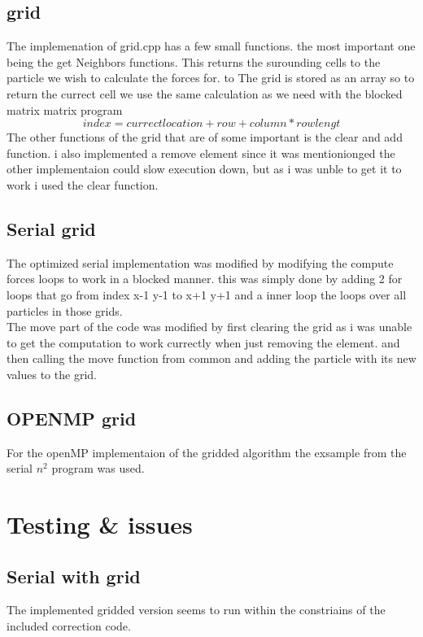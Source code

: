 \documentclass[a4paper,10pt,titlepage]{report}
\begin{document}
\subsection{grid}
The implemenation of grid.cpp has a few small functions. the most important one being the get Neighbors functions. This returns the surounding cells to the particle we wish to calculate the forces for. to The grid is stored as an array so to return the currect cell we use the same calculation as we need with the blocked matrix matrix program
\begin{equation}
index = currect location + row + column * rowlengt
\end{equation}
The other functions of the grid that are of some important is the clear and add function. i also implemented a remove element since it was mentionionged the other implementaion could slow execution down, but as i was unble to get it to work i used the clear function.

\subsection{Serial grid}

The optimized serial implementation was modified by modifying the compute forces loops to work in a blocked manner. this was simply done by adding 2 for loops that go from index x-1 y-1 to x+1 y+1 and a inner loop the loops over all particles in those grids.\\
The move part of the code was modified by first clearing the grid as i was unable to get the computation to work currectly when just removing the element. and then calling the move function from common and adding the particle with its new values to the grid. 

\subsection{OPENMP grid}
For the openMP implementaion of the gridded algorithm the exsample from the serial $n^2$ program was used.


\section{Testing \& issues}

\subsection{Serial with grid}
The implemented gridded version seems to run within the constriains of the included correction code.
\end{document}
